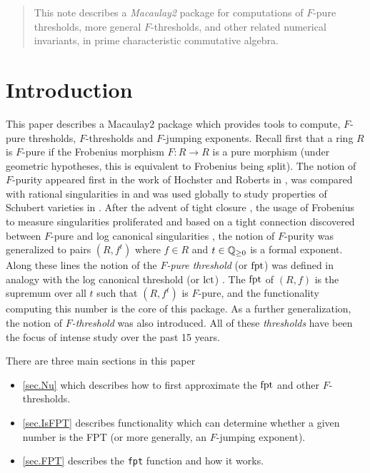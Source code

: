 \documentclass{amsart}
\begin{document}
\begin{abstract}
	This note describes a \emph{Macaulay2} package for computations of $F$-pure thresholds, more general $F$-thresholds, and other related numerical invariants, in prime characteristic commutative algebra.  
\end{abstract}




\maketitle

\section{Introduction}

This paper describes a Macaulay2 package which provides tools to compute, $F$-pure thresholds, $F$-thresholds and $F$-jumping exponents.  Recall first that a ring $R$ is $F$-pure if the Frobenius morphism $F : R \to R$ is a pure morphism (under geometric hypotheses, this is equivalent to Frobenius being split).  The notion of $F$-purity appeared first in the work of Hochster and Roberts in \cite{HochsterRobertsFrobeniusLocalCohomology}, was compared with rational singularities in \cite{FedderFPureRat} and was used globally to study properties of Schubert varieties in \cite{MehtaRamanathanFrobeniusSplittingAndCohomologyVanishing}.  After the advent of tight closure \cite{HochsterHunekeTC1}, the usage of Frobenius to measure singularities proliferated and based on a tight connection discovered between $F$-pure and log canonical singularities \cite{HaraWatanabeFRegFPure}, the notion of $F$-purity was generalized to pairs $(R, f^t)$ where $f \in R$ and $t \in \mathbb{Q}_{\geq 0}$ is a formal exponent.  Along these lines the notion of the \emph{$F$-pure threshold} (or $\operatorname{{fpt}}$) was defined in analogy with the log canonical threshold (or $\operatorname{{lct}}$) \cite{TakagiWatanabeFPureThresh,MustataTakagiWatanabeFThresholdsAndBernsteinSato}.  The $\operatorname{{fpt}}$ of $(R, f)$ is the supremum over all $t$ such that $(R, f^t)$ is $F$-pure, and the functionality computing this number is the core of this package.  As a further generalization, the notion of \emph{$F$-threshold} was also introduced.  All of these \emph{thresholds} have been the focus of intense study over the past 15 years.

There are three main sections in this paper
\begin{itemize}
\item{} \autoref{sec.Nu} which describes how to first approximate the $\operatorname{{fpt}}$ and other $F$-thresholds.  
\item{} \autoref{sec.IsFPT} describes functionality which can determine whether a given number is the FPT (or more generally, an $F$-jumping exponent).
\item{} \autoref{sec.FPT} describes the {\tt fpt} function and how it works.
\end{itemize}
\end{document}

